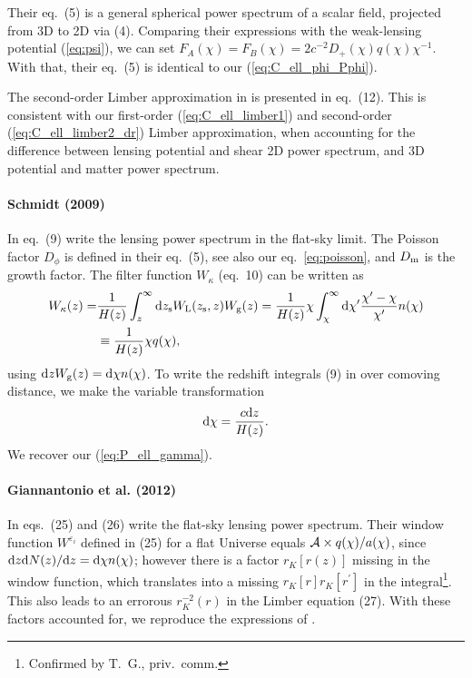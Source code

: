 \documentclass[useAMS,usenatbib]{mn2e} %
\newcommand{\pref}{{\cal A}}
\begin{document}
\begin{appendix}
Their eq.~(5) is a general spherical power spectrum of a scalar field,
projected from 3D to 2D via (4). Comparing their expressions with the
weak-lensing potential (\ref{eq:psi}), we can set $F_A(\chi) = F_B(\chi) = 2
c^{-2} D_+(\chi) q(\chi) \chi^{-1}$. With that, their eq.~(5) is identical to
our (\ref{eq:C_ell_phi_Pphi}).

The second-order Limber approximation in \cite{2008PhRvD..78l3506L} is presented in
eq.~(12). This is consistent with our first-order (\ref{eq:C_ell_limber1}) and
second-order (\ref{eq:C_ell_limber2_dr}) Limber approximation, when accounting for the difference between
lensing potential and shear 2D power spectrum, and 3D potential and matter power spectrum.


\paragraph{Schmidt (2009)}

In eq.~(9) \cite{2008PhRvD..78d3002S} write the lensing power spectrum in the
flat-sky limit. The Poisson factor $D_\phi$ is defined in their eq.~(5), see
also our eq.~\ref{eq:poisson}, and $D_{\rm m}$ is the growth factor. The filter
function $W_\kappa$ (eq.~10) can be written as
%
\begin{align}
  W_\kappa(z) = & \frac 1 {H(z)} \int_z^\infty {\rm d} z_{\rm s} W_{\rm L}(z_{\rm s}, z) W_{\rm g}(z)
              =  \frac 1 {H(z)} \chi \int_\chi^\infty {\rm d} \chi^\prime \frac{\chi^\prime - \chi}{\chi^\prime}
                n(\chi)
              \nonumber \\
              & \equiv \frac 1 {H(z)} \chi q(\chi),
\end{align}
%
using ${\rm d} z W_{\rm g}(z) = {\rm d} \chi n(\chi)$.
To write the redshift integrals (9) in \cite{2008PhRvD..78d3002S} over 
comoving distance, we make the variable transformation
%
\begin{equation}
  {\rm d} \chi = \frac{c {\rm d} z}{H(z)} .
\end{equation}
%
We recover our (\ref{eq:P_ell_gamma}).

\paragraph{Giannantonio et al. (2012)}

In eqs.~(25) and (26) \cite{2012MNRAS.422.2854G} write the flat-sky lensing
power spectrum. Their window function $W^{\varepsilon_i}$ defined in (25) for a
flat Universe equals $\pref \times q(\chi) / a(\chi)$, since ${\rm d} z {\rm d}
N(z)/{\rm d} z = {\rm d} \chi n(\chi)$; however there is a factor $r_K[r(z)]$
missing in the window function, which translates into a missing $r_K[r]
r_K[r^\prime]$ in the integral\footnote{Confirmed by T.~G., priv.~comm.}. This
also leads to an errorous $r_K^{-2}(r)$ in the Limber equation (27). With these
factors accounted for, we reproduce the expressions of \cite{2012MNRAS.422.2854G}.


\label{lastpage}

\end{appendix}
\end{document}
